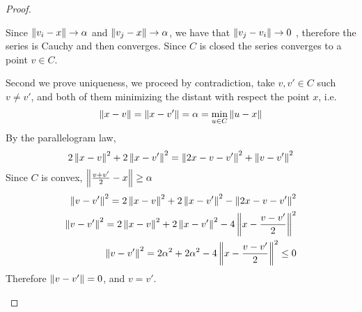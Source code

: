 \begin{lemma}
\begin{proof}
\begin{enumerate}
		Since $\left\lVert v_i-x\right\rVert\rightarrow \alpha$ and $\left\lVert v_j -x\right\rVert\rightarrow \alpha$, we have that $\left\lVert v_j-v_i\right\rVert\rightarrow 0$ , therefore the series is Cauchy and then converges. Since $C$ is closed the series converges to a point $v \in C$. 
		
		Second we prove uniqueness, we proceed by contradiction, take $v, v' \in C$ such $v\neq v'$, and both of them minimizing the distant with respect the point $x$, i.e.
		\[
		\left\lVert x-v\right\rVert=\left\lVert x-v'\right\rVert=\alpha=\min_{u\in C}\left\lVert u-x\right\rVert
		\]
		By the parallelogram law,
		\begin{equation*}
			2\left\lVert x-v\right\rVert^2+2\left\lVert x-v'\right\rVert^2=\left\lVert2x-v-v'\right\rVert^2 +\left\lVert v-v'\right\rVert^2
		\end{equation*}
		Since $C$ is convex, $\left\lVert\frac{v+v'}{2}-x\right\rVert\geq\alpha$
		\begin{align*}
			\left\lVert v-v'\right\rVert^2=2\left\lVert x-v\right\rVert^2+2\left\lVert x-v'\right\rVert^2-\left\lVert2x-v-v'\right\rVert^2 \\
			\left\lVert v-v'\right\rVert^2=2\left\lVert x-v\right\rVert^2+2\left\lVert x-v'\right\rVert^2-4\left\lVert x-\frac{v-v'}{2}\right\rVert^2 \\
			\left\lVert v-v'\right\rVert^2=2\alpha^2+2\alpha^2-4\left\lVert x-\frac{v-v'}{2}\right\rVert^2\leq 0
		\end{align*}
		Therefore $\left\lVert v-v'\right\rVert=0$, and $v=v'$.
		

\end{enumerate}
\end{proof}
\end{lemma}
